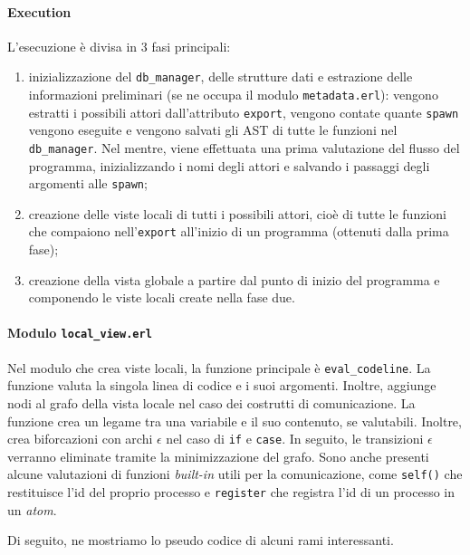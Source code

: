 \paragraph{Execution} L'esecuzione \`e divisa in 3 fasi principali:
\begin{enumerate}
    \item inizializzazione del \texttt{db\_manager}, delle strutture dati e estrazione delle informazioni preliminari (se ne occupa il modulo \texttt{metadata.erl}): vengono estratti i possibili attori dall'attributo \texttt{export}, vengono contate quante \texttt{spawn} vengono eseguite e vengono salvati gli AST di tutte le funzioni nel \texttt{db\_manager}. Nel mentre, viene effettuata una prima valutazione del flusso del programma, inizializzando i nomi degli attori e salvando i passaggi degli argomenti alle \texttt{spawn};
    
    \item creazione delle viste locali di tutti i possibili attori, cio\`e di tutte le funzioni che compaiono nell'\texttt{export} all'inizio di un programma (ottenuti dalla prima fase);
    
    \item creazione della vista globale a partire dal punto di inizio del programma e componendo le viste locali create nella fase due.
\end{enumerate}

\paragraph{Modulo \texttt{local\_view.erl}}

Nel modulo che crea viste locali, la funzione principale \`e \texttt{eval\_codeline}. La funzione valuta la singola linea di codice e i suoi argomenti. Inoltre, aggiunge nodi al grafo della vista locale nel caso dei costrutti di comunicazione. La funzione crea un legame tra una variabile e il suo contenuto, se valutabili. Inoltre, crea biforcazioni con archi $\epsilon$ nel caso di \texttt{if} e \texttt{case}. In seguito, le transizioni $\epsilon$ verranno eliminate tramite la minimizzazione del grafo. Sono anche presenti alcune valutazioni di funzioni \textit{built-in} utili per la comunicazione, come \texttt{self()} che restituisce l'id del proprio processo e \texttt{register} che registra l'id di un processo in un \textit{atom}.

\bigskip

\noindent Di seguito, ne mostriamo lo pseudo codice di alcuni rami interessanti.

